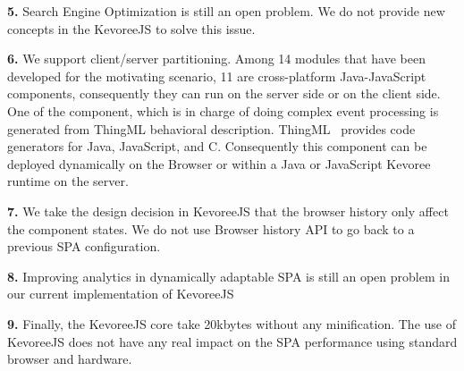 \indent \textbf{5.} Search Engine Optimization is still an open problem. We do not provide new concepts in the KevoreeJS to solve this issue.    

\indent \textbf{6.} We support client/server partitioning. Among 14 modules that have been developed for the motivating scenario, 11 are cross-platform Java-JavaScript components, consequently they can run on the server side or on the client side.  One of the component, which is in charge of doing complex event processing is generated from ThingML behavioral description. ThingML~\cite{DBLP:conf/models/FleureyMSB11} provides code generators for Java, JavaScript, and C. Consequently this component can be deployed dynamically on the Browser or within a Java or JavaScript Kevoree runtime on the server.  

\indent \textbf{7.} We take the design decision in KevoreeJS that the browser history only affect the component states. We do not use Browser history API to go back to a previous SPA configuration. 

\indent \textbf{8.} Improving analytics in dynamically adaptable SPA is still an open problem in our current implementation of KevoreeJS   

\indent \textbf{9.} Finally, the KevoreeJS core take 20kbytes without any minification. The use of KevoreeJS does not have any real impact on the SPA performance using standard browser and hardware.

